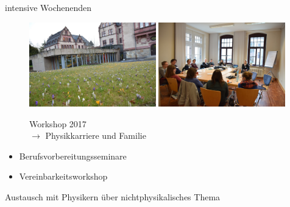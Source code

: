 \documentclass[
]{beamer}
\begin{document}
\begin{frame}{intensive Wochenenden}
  \begin{minipage}{0.52\textwidth}
    \begin{figure}
      \centering
      \includegraphics[width=0.49\textwidth]{figure/vereinbarkeitsworkshop_2017_PZ}\hfill
      \includegraphics[width=0.49\textwidth]{figure/vereinbarkeitsworkshop_2017_TN}\\
      \begin{center}
        \small{Workshop 2017\\ $\rightarrow$ Physikkarriere und Familie}
      \end{center}
     \end{figure}
  \end{minipage}%
  \hfill
  \begin{minipage}{0.47\textwidth}
    \begin{itemize}
      \item Berufsvorbereitungsseminare
      \item Vereinbarkeitsworkshop
    \end{itemize}
    \begin{center}
      Austausch mit Physikern über nichtphysikalisches Thema
    \end{center}
  \end{minipage}
\end{frame}
\end{document}
